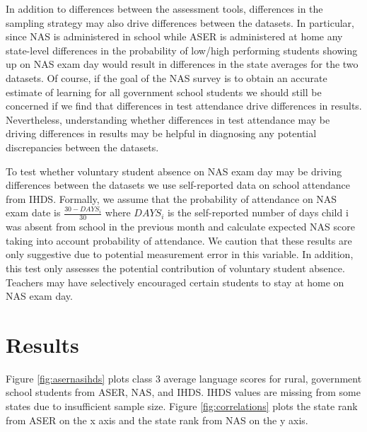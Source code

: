\documentclass[
  11pt,
]{article}
\begin{document}
In addition to differences between the assessment tools, differences in the sampling strategy may also drive differences between the datasets. In particular, since NAS is administered in school while ASER is administered at home any state-level differences in the probability of low/high performing students showing up on NAS exam day would result in differences in the state averages for the two datasets. Of course, if the goal of the NAS survey is to obtain an accurate estimate of learning for all government school students we should still be concerned if we find that differences in test attendance drive differences in results. Nevertheless, understanding whether differences in test attendance may be driving differences in results may be helpful in diagnosing any potential discrepancies between the datasets.

To test whether voluntary student absence on NAS exam day may be driving differences between the datasets we use self-reported data on school attendance from IHDS. Formally, we assume that
the probability of attendance on NAS exam date is \(\frac{30-DAYS_{i}}{30}\) where \(DAYS_{i}\) is the self-reported number of days child i was absent from school in the previous month and calculate expected NAS score taking into account probability of attendance. We caution that these results are only suggestive due to potential measurement error in this variable. In addition, this test only assesses the potential contribution of voluntary student absence. Teachers may have selectively encouraged certain students to stay at home on NAS exam day.

\hypertarget{results}{%
\section{Results}\label{results}}

Figure \ref{fig:asernasihds} plots class 3 average language scores for rural, government school students from ASER, NAS, and IHDS. IHDS values are missing from some states due to insufficient sample size. Figure \ref{fig:correlations} plots the state rank from ASER on the x axis and the state rank from NAS on the y axis.
\end{document}

